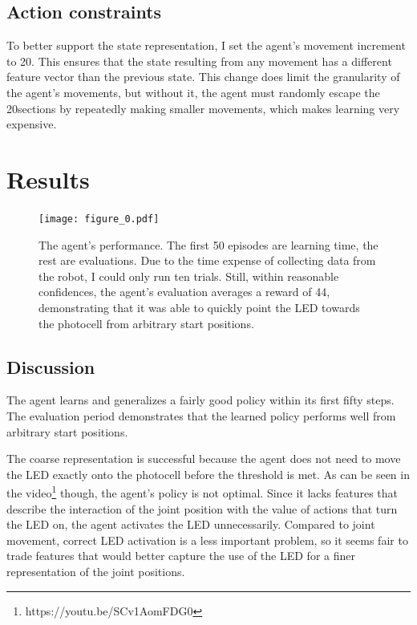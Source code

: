 \documentclass{article}
\begin{document}
	\subsection{Action constraints}
	To better support the state representation, I set the agent's movement increment to 20\degree. This ensures that the state resulting from any movement has a different feature vector than the previous state. This change does limit the granularity of the agent's movements, but without it, the agent must randomly escape the 20\degree sections by repeatedly making smaller movements, which makes learning very expensive. 
	
	
	
	\section{Results}

	
		\begin{figure}[h]
			\begin{center}
				\texttt{[image: figure\_0.pdf]}
				\caption{The agent's performance. The first 50 episodes are learning time, the rest are evaluations. Due to the time expense of collecting data from the robot, I could only run ten trials. Still, within reasonable confidences, the agent's evaluation averages a reward of 44, demonstrating that it was able to quickly point the LED towards the photocell from arbitrary start positions.}
			\end{center}
		\end{figure}
		
	\subsection{Discussion}

	The agent learns and generalizes a fairly good policy within its first fifty steps. The evaluation period demonstrates that the learned policy performs well from arbitrary start positions. 
	
	The coarse representation is successful because the agent does not need to move the LED exactly onto the photocell before the threshold is met. As can be seen in the video\footnote{https://youtu.be/SCv1AomFDG0} though, the agent's policy is not optimal. Since it lacks features that describe the interaction of the joint position with the value of actions that turn the LED on, the agent activates the LED unnecessarily. Compared to joint movement, correct LED activation is a less important problem, so it seems fair to trade features that would better capture the use of the LED for a finer representation of the joint positions.
	
\end{document}
